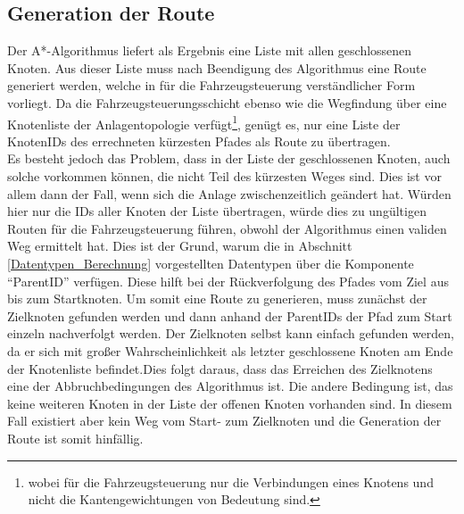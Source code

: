 		\subsection{Generation der Route}
			\label{Routengeneration}
			Der A*-Algorithmus liefert als Ergebnis eine Liste mit allen geschlossenen Knoten. Aus dieser Liste muss nach Beendigung des Algorithmus eine Route generiert werden, welche in für die Fahrzeugsteuerung verständlicher Form vorliegt. Da die Fahrzeugsteuerungsschicht ebenso wie die Wegfindung über eine Knotenliste der Anlagentopologie verfügt\footnote{wobei für die Fahrzeugsteuerung nur die Verbindungen eines Knotens und nicht die Kantengewichtungen von  Bedeutung sind.}, genügt es, nur eine Liste der KnotenIDs des errechneten kürzesten Pfades als Route zu übertragen.
			\\[4pt]
			Es besteht jedoch das Problem, dass in der Liste der geschlossenen Knoten, auch solche vorkommen können, die nicht Teil des kürzesten Weges sind. Dies ist vor allem dann der Fall, wenn sich die Anlage zwischenzeitlich geändert hat. Würden hier nur die IDs aller Knoten der Liste übertragen, würde dies zu ungültigen Routen für die Fahrzeugsteuerung führen, obwohl der Algorithmus einen validen Weg ermittelt hat. Dies ist der Grund, warum die in Abschnitt \ref{Datentypen_Berechnung} vorgestellten Datentypen über die Komponente "`ParentID"' verfügen. Diese hilft bei der Rückverfolgung  des Pfades vom Ziel aus bis zum Startknoten. Um somit eine Route zu generieren, muss zunächst der Zielknoten gefunden werden und dann anhand der ParentIDs der Pfad zum Start einzeln nachverfolgt werden. Der Zielknoten selbst kann einfach gefunden werden, da er sich mit großer Wahrscheinlichkeit als letzter geschlossene Knoten am Ende der Knotenliste befindet.Dies folgt daraus, dass das Erreichen des Zielknotens eine der Abbruchbedingungen des Algorithmus ist. Die andere Bedingung ist, das keine weiteren Knoten in der Liste der offenen Knoten vorhanden sind. In diesem Fall existiert aber kein Weg vom Start- zum Zielknoten und die Generation der Route ist somit hinfällig.
			\\[4pt]
